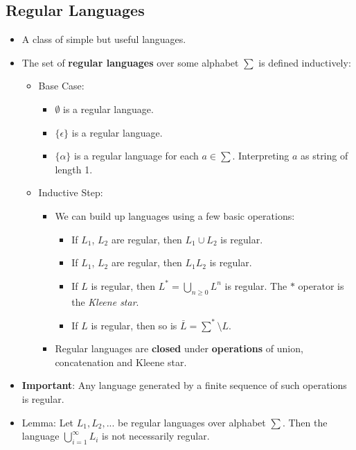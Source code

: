 \documentclass[12pt]{article}
\begin{document}
\subsection{Regular Languages}
\begin{itemize}
    \item A class of simple but useful languages.
    \item The set of \textbf{regular languages} over some alphabet $\sum$ is defined inductively:
    \begin{itemize}
        \item Base Case:
        \begin{itemize}
            \item $\emptyset$ is a regular language.
            \item $\{\epsilon\}$ is a regular language.
            \item $\{ \alpha \}$ is a regular language for each $a \in \sum$. Interpreting $a$ as string of length 1.
        \end{itemize}
        \item Inductive Step:
        \begin{itemize}
            \item We can build up languages using a few basic operations:
            \begin{itemize}
                \item If $L_1$, $L_2$ are regular, then $L_1 \cup L_2$ is regular.
                \item If $L_1$, $L_2$ are regular, then $L_1 L_2$ is regular.
                \item If $L$ is regular, then $L^{\ast} = \bigcup_{n \geq 0} L^n$ is regular. The $\ast$ operator is the \textit{Kleene star}.
                \item If $L$ is regular, then so is $\bar{L} = \sum^{\ast} \setminus L$.
            \end{itemize}
            \item Regular languages are \textbf{closed} under \textbf{operations} of union, concatenation and Kleene star.
        \end{itemize}
    \end{itemize}
    \item \textbf{Important}: Any language generated by a finite sequence of such operations is regular.
    \item Lemma: Let $L_1, L_2, ...$ be regular languages over alphabet $\sum$. Then the language $\bigcup_{i=1}^{\infty} L_i$ is not necessarily regular.
\end{itemize}
\end{document}
